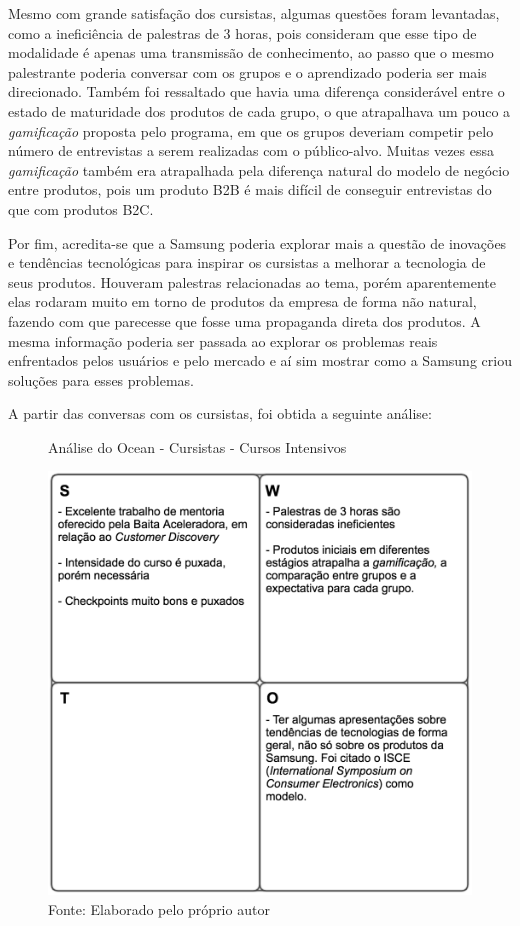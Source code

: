 Mesmo com grande satisfação dos cursistas, algumas questões foram levantadas, como a ineficiência de palestras de 3 horas, pois consideram que esse tipo de modalidade é apenas uma transmissão de conhecimento, ao passo que o mesmo palestrante poderia conversar com os grupos e o aprendizado poderia ser mais direcionado. Também foi ressaltado que havia uma diferença considerável entre o estado de maturidade dos produtos de cada grupo, o que atrapalhava um pouco a \textit{gamificação} proposta pelo programa, em que os grupos deveriam competir pelo número de entrevistas a serem realizadas com o público-alvo. Muitas vezes essa \textit{gamificação} também era atrapalhada pela diferença natural do modelo de negócio entre produtos, pois um produto B2B é mais difícil de conseguir entrevistas do que com produtos B2C.

Por fim, acredita-se que a Samsung poderia explorar mais a questão de inovações e tendências tecnológicas para inspirar os cursistas a melhorar a tecnologia de seus produtos. Houveram palestras relacionadas ao tema, porém aparentemente elas rodaram muito em torno de produtos da empresa de forma não natural, fazendo com que parecesse que fosse uma propaganda direta dos produtos. A mesma informação poderia ser passada ao explorar os problemas reais enfrentados pelos usuários e pelo mercado e aí sim mostrar como a Samsung criou soluções para esses problemas.

A partir das conversas com os cursistas, foi obtida a seguinte análise:

\begin{figure}[h]
\caption{Análise do Ocean - Cursistas - Cursos Intensivos}
\centerline{\includegraphics[scale=0.75]{img/cursosintensivosswot}}
\label{fig:swotcursistasintensivos}
\caption* {Fonte: Elaborado pelo próprio autor}
\end{figure}
